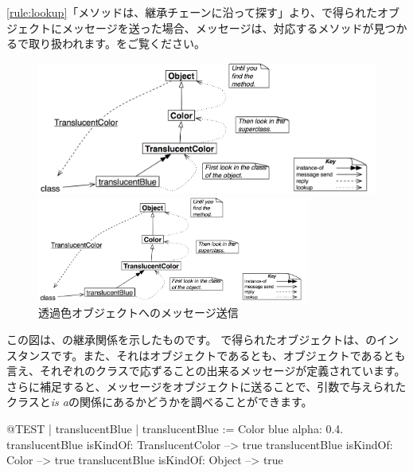 \documentclass[a4paper,10pt,twoside]{book}
\begin{document}
\ref{rule:lookup}「メソッドは、継承チェーンに沿って探す」より、で得られたオブジェクトにメッセージを送った場合、メッセージは、対応するメソッドが見つかるで取り扱われます。をご覧ください。

\begin{center}
\begin{figure}[!ht]
\ifluluelse
	{\centerline{\includegraphics[width=\textwidth]{TranslucentClassMessage}}}
	{\centerline{\includegraphics[width=0.8\textwidth]{TranslucentClassMessage}}}
\caption{透過色オブジェクトへのメッセージ送信}
\end{figure}
\end{center}

この図は、の継承関係を示したものです。
で得られたオブジェクトは、のインスタンスです。また、それはオブジェクトであるとも、オブジェクトであるとも言え、それぞれのクラスで応ずることの出来るメッセージが定義されています。
さらに補足すると、メッセージをオブジェクトに送ることで、引数で与えられたクラスと\emph{is a}の関係にあるかどうかを調べることができます。
\begin{code}{@TEST | translucentBlue |}
translucentBlue := Color blue alpha: 0.4.
translucentBlue isKindOf: TranslucentColor --> true
translucentBlue isKindOf: Color                    --> true
translucentBlue isKindOf: Object                  --> true
\end{code}

\end{document}
